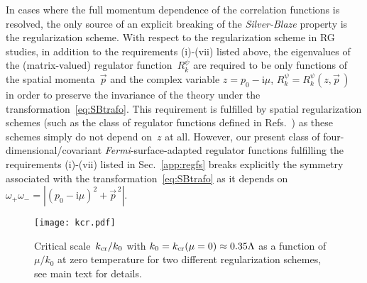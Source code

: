 \documentclass[prd,english,preprintnumbers,amsmath,amssymb,nofootinbib,twocolumn,superscriptaddress]{revtex4-1}
\newcommand{\I}{\mathrm{i}}
\begin{document}
{{In cases where the full momentum dependence of the correlation functions is resolved,
the only source of an explicit breaking of the {\it Silver-Blaze} property is the regularization scheme.
With respect to the regularization scheme in RG studies, 
in addition to the requirements (i)-(vii) listed above, the eigenvalues of the (matrix-valued) 
regulator function~$R^{\psi}_k$ are required to be only functions 
of the spatial momenta~$\vec{p}$ and the complex variable $z=p_0-\I\mu$, $R^{\psi}_k = R^{\psi}_k(z,\vec{p}^{\,})$~\cite{Khan:2015puu}
in order to preserve the invariance of the theory under the transformation~\eqref{eq:SBtrafo}. 
This requirement is fulfilled by spatial regularization schemes (such as 
the class of regulator functions defined in 
Refs.~\cite{Braun:2003ii,Schaefer:2004en,Blaizot:2006rj,Litim:2006ag}) as these schemes simply do not
depend on~$z$ at all. 
However, our present class of four-dimensional/covariant {\it Fermi}-surface-adapted
regulator functions fulfilling the requirements (i)-(vii) listed in Sec.~\ref{app:regfs}
breaks explicitly the symmetry associated with the {transformation~\eqref{eq:SBtrafo} 
as it depends on~$\omega_{+}\omega_{-}=|(p_0-\I\mu)^2+\vec{p}^{\,2}|$.}
%
\begin{figure}[t]
\centering
\texttt{[image: kcr.pdf]}
\caption{Critical scale~$k_{\rm cr}/k_0$ with $k_0=k_{\rm cr}(\mu=0)\approx 0.35\Lambda$ as a function of~$\mu/k_0$ at zero temperature 
for two different regularization schemes, see {main text for details}.}
\label{fig:kcr}
\end{figure}
%

}}
\end{document}

